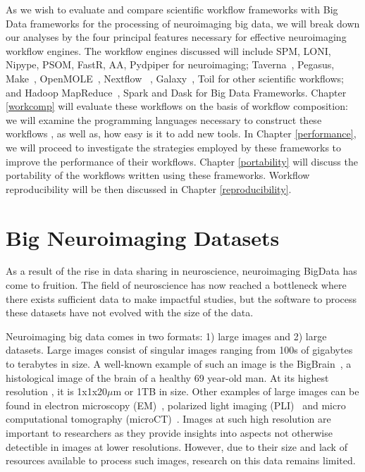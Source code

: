 \documentclass{report}
\begin{document}
        As we wish to evaluate and compare scientific workflow frameworks with
        Big Data frameworks for the processing of neuroimaging big data, we will
        break down our analyses by the four principal features necessary for
        effective neuroimaging workflow engines. The workflow engines discussed
        will include SPM, LONI, Nipype, PSOM, FastR, AA, Pydpiper 
        for neuroimaging; Taverna~\cite{doi:10.1093/bioinformatics/bth361}, 
        Pegasus, Make~\cite{10.3389/fninf.2016.00002}, 
        OpenMOLE~\cite{passerat2014openmole}, Nextflow~\cite{Di-Tommaso:2017aa}
        , Galaxy~\cite{Goecks2010}, 
        Toil for other scientific workflows; and Hadoop 
        MapReduce~\cite{Dean:2008:MSD:1327452.1327492}, Spark and Dask for
        Big Data Frameworks. Chapter \ref{workcomp} will evaluate these 
        workflows on the basis of workflow composition: we will %
        examine the programming languages necessary to construct these workflows
        , as well as, how easy is it to add new tools. In Chapter 
        \ref{performance}, we will proceed to 
        investigate the strategies employed by these frameworks to improve the 
        performance of their workflows. Chapter \ref{portability} will discuss
        the portability of the workflows written using these frameworks. 
        Workflow reproducibility will be then discussed in Chapter 
        \ref{reproducibility}.
        

        \section{Big Neuroimaging Datasets}\label{datasets}

            As a result of the rise in data sharing in neuroscience, 
            neuroimaging
            BigData has come to fruition. The field of neuroscience has now
            reached a bottleneck where there exists sufficient data to make
            impactful studies, but the software to process these datasets have 
            not evolved with the size of the data.

            Neuroimaging big data comes in two formats: 1) large images and 2) 
            large datasets. Large images consist of singular images ranging 
            from 100s of gigabytes to terabytes in size. A well-known example 
            of 
            such an image is the BigBrain~\cite{Amunts1472}, a histological 
            image 
            of the brain of a healthy 69 year-old man. At its highest resolution
            , it is 1x1x20$\mu$m or 1TB in
            size. Other examples of large images can be found in electron 
            microscopy (EM)~\cite{Hildebrand:2017aa}, polarized light imaging 
            (PLI)~\cite{10.1007/978-3-319-12084-3_1} and micro computational
            tomography (microCT)~\cite{10.1371/journal.pone.0035691}. 
            Images at 
            such high resolution are important to researchers as they provide 
            insights into aspects not otherwise detectible in images at lower 
            resolutions. However, due to their size and lack of resources 
            available to process such images, research on this data remains 
            limited.
\end{document}

